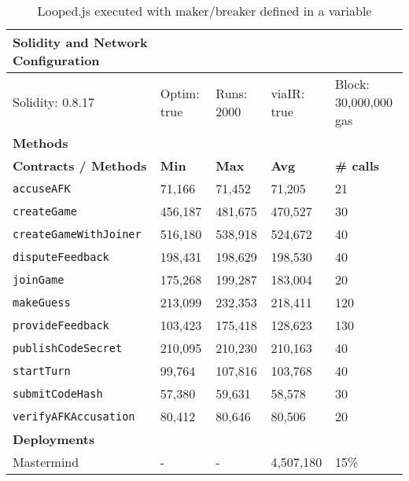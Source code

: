 \begin{table}[ht]
\centering
\begin{tabular}{|l|l|l|l|l|}
\hline
\textbf{Solidity and Network Configuration} & \multicolumn{4}{l|}{} \\ \hline
Solidity: 0.8.17 & Optim: true & Runs: 2000 & viaIR: true & Block: 30,000,000 gas \\ \hline
\textbf{Methods} & \multicolumn{4}{l|}{} \\ \hline
\textbf{Contracts / Methods} & \textbf{Min} & \textbf{Max} & \textbf{Avg} & \textbf{\# calls} \\ \hline

\texttt{accuseAFK} & 71,166 & 71,452 & 71,205 & 21 \\ \hline
\texttt{createGame} & 456,187 & 481,675 & 470,527 & 30 \\ \hline
\texttt{createGameWithJoiner} & 516,180 & 538,918 & 524,672 & 40 \\ \hline
\texttt{disputeFeedback} & 198,431 & 198,629 & 198,530 & 40 \\ \hline
\texttt{joinGame} & 175,268 & 199,287 & 183,004 & 20 \\ \hline
\texttt{makeGuess} & 213,099 & 232,353 & 218,411 & 120 \\ \hline
\texttt{provideFeedback} & 103,423 & 175,418 & 128,623 & 130 \\ \hline
\texttt{publishCodeSecret} & 210,095 & 210,230 & 210,163 & 40 \\ \hline
\texttt{startTurn} & 99,764 & 107,816 & 103,768 & 40 \\ \hline
\texttt{submitCodeHash} & 57,380 & 59,631 & 58,578 & 30 \\ \hline
\texttt{verifyAFKAccusation} & 80,412 & 80,646 & 80,506 & 20 \\ \hline
\textbf{Deployments} & \multicolumn{4}{l|}{} \\ \hline
Mastermind & - & - & 4,507,180 & 15\% \\ \hline
\end{tabular}
\caption{Looped.js executed with maker/breaker defined in a variable}
\label{tab:looped-3-maker}
\end{table}

\label{fig:mastermind_schema}

\afterpage{
    \clearpage %
    
    \clearpage %
}
